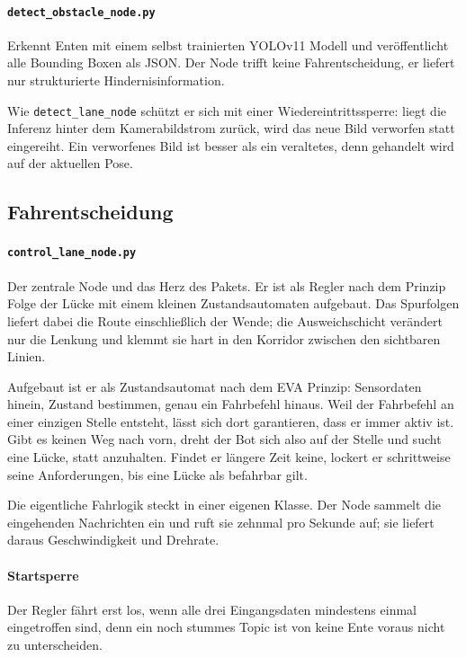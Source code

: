 \documentclass[10pt,a4paper]{article}
\begin{document}
\paragraph{\texttt{detect\_obstacle\_node.py}} Erkennt Enten mit einem selbst
trainierten YOLOv11 Modell und veröffentlicht alle Bounding Boxen als JSON. Der
Node trifft keine Fahrentscheidung, er liefert nur strukturierte
Hindernisinformation.

Wie \texttt{detect\_lane\_node} schützt er sich mit einer
Wiedereintrittssperre: liegt die Inferenz hinter dem Kamerabildstrom zurück,
wird das neue Bild verworfen statt eingereiht. Ein verworfenes Bild ist besser
als ein veraltetes, denn gehandelt wird auf der aktuellen Pose.

\subsection{Fahrentscheidung}

\paragraph{\texttt{control\_lane\_node.py}} Der zentrale Node und das Herz des
Pakets. Er ist als Regler nach dem Prinzip \glqq Folge der Lücke\grqq{} mit
einem kleinen Zustandsautomaten aufgebaut. Das Spurfolgen liefert dabei die
Route einschließlich der Wende; die Ausweichschicht verändert nur die Lenkung
und klemmt sie hart in den Korridor zwischen den sichtbaren Linien.

Aufgebaut ist er als Zustandsautomat nach dem EVA Prinzip: Sensordaten hinein,
Zustand bestimmen, genau ein Fahrbefehl hinaus. Weil der Fahrbefehl an einer
einzigen Stelle entsteht, lässt sich dort garantieren, dass er immer aktiv ist.
Gibt es keinen Weg nach vorn, dreht der Bot sich also auf der Stelle und sucht
eine Lücke, statt anzuhalten. Findet er längere Zeit keine, lockert er
schrittweise seine Anforderungen, bis eine Lücke als befahrbar gilt.

Die eigentliche Fahrlogik steckt in einer eigenen Klasse. Der Node sammelt die
eingehenden Nachrichten ein und ruft sie zehnmal pro Sekunde auf; sie liefert
daraus Geschwindigkeit und Drehrate.

\paragraph{Startsperre} Der Regler fährt erst los, wenn alle drei Eingangsdaten
mindestens einmal eingetroffen sind, denn ein noch stummes Topic ist von
\glqq keine Ente voraus\grqq{} nicht zu unterscheiden.
\end{document}
